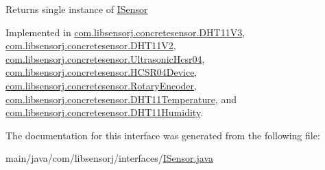 \begin{DoxyReturn}{Returns}
single instance of \hyperlink{interfacecom_1_1libsensorj_1_1interfaces_1_1ISensor}{I\+Sensor} 
\end{DoxyReturn}


Implemented in \hyperlink{classcom_1_1libsensorj_1_1concretesensor_1_1DHT11V3_a94e402a3ea89ad3ee46725fdd64b4c82}{com.\+libsensorj.\+concretesensor.\+D\+H\+T11\+V3}, \hyperlink{classcom_1_1libsensorj_1_1concretesensor_1_1DHT11V2_afff27f29285f26230faa8ecda6b6b102}{com.\+libsensorj.\+concretesensor.\+D\+H\+T11\+V2}, \hyperlink{classcom_1_1libsensorj_1_1concretesensor_1_1UltrasonicHcsr04_a170167614b330d79518647a9a9722b62}{com.\+libsensorj.\+concretesensor.\+Ultrasonic\+Hcsr04}, \hyperlink{classcom_1_1libsensorj_1_1concretesensor_1_1HCSR04Device_a3395de7d81b875516fb5c539accb27d1}{com.\+libsensorj.\+concretesensor.\+H\+C\+S\+R04\+Device}, \hyperlink{classcom_1_1libsensorj_1_1concretesensor_1_1RotaryEncoder_aa0e07b8e5979b940a4a8bcb96d3af51e}{com.\+libsensorj.\+concretesensor.\+Rotary\+Encoder}, \hyperlink{classcom_1_1libsensorj_1_1concretesensor_1_1DHT11Temperature_a599358623598fb0076dc0a2e07978f0b}{com.\+libsensorj.\+concretesensor.\+D\+H\+T11\+Temperature}, and \hyperlink{classcom_1_1libsensorj_1_1concretesensor_1_1DHT11Humidity_a2355dc003abad8d519440e9f6871c422}{com.\+libsensorj.\+concretesensor.\+D\+H\+T11\+Humidity}.



The documentation for this interface was generated from the following file\+:\begin{DoxyCompactItemize}
\item 
main/java/com/libsensorj/interfaces/\hyperlink{ISensor_8java}{I\+Sensor.\+java}\end{DoxyCompactItemize}
